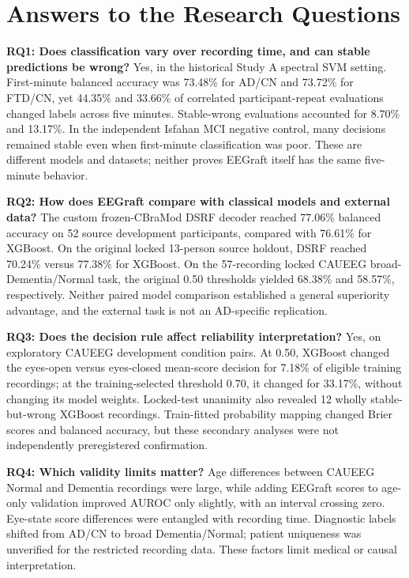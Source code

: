\section{Answers to the Research Questions}
\textbf{RQ1: Does classification vary over recording time, and can stable predictions be wrong?} Yes, in the historical Study A spectral SVM setting. First-minute balanced accuracy was 73.48\% for AD/CN and 73.72\% for FTD/CN, yet 44.35\% and 33.66\% of correlated participant-repeat evaluations changed labels across five minutes. Stable-wrong evaluations accounted for 8.70\% and 13.17\%. In the independent Isfahan MCI negative control, many decisions remained stable even when first-minute classification was poor. These are different models and datasets; neither proves EEGraft itself has the same five-minute behavior.

\textbf{RQ2: How does EEGraft compare with classical models and external data?} The custom frozen-CBraMod DSRF decoder reached 77.06\% balanced accuracy on 52 source development participants, compared with 76.61\% for XGBoost. On the original locked 13-person source holdout, DSRF reached 70.24\% versus 77.38\% for XGBoost. On the 57-recording locked CAUEEG broad-Dementia/Normal task, the original 0.50 thresholds yielded 68.38\% and 58.57\%, respectively. Neither paired model comparison established a general superiority advantage, and the external task is not an AD-specific replication.

\textbf{RQ3: Does the decision rule affect reliability interpretation?} Yes, on exploratory CAUEEG development condition pairs. At 0.50, XGBoost changed the eyes-open versus eyes-closed mean-score decision for 7.18\% of eligible training recordings; at the training-selected threshold 0.70, it changed for 33.17\%, without changing its model weights. Locked-test unanimity also revealed 12 wholly stable-but-wrong XGBoost recordings. Train-fitted probability mapping changed Brier scores and balanced accuracy, but these secondary analyses were not independently preregistered confirmation.

\textbf{RQ4: Which validity limits matter?} Age differences between CAUEEG Normal and Dementia recordings were large, while adding EEGraft scores to age-only validation improved AUROC only slightly, with an interval crossing zero. Eye-state score differences were entangled with recording time. Diagnostic labels shifted from AD/CN to broad Dementia/Normal; patient uniqueness was unverified for the restricted recording data. These factors limit medical or causal interpretation.

